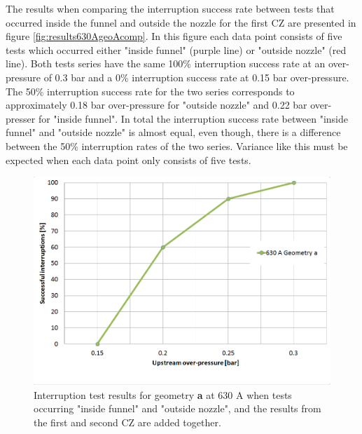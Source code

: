 \documentclass[10pt,b5paper,twoside]{article}
\begin{document}
The results when comparing the interruption success rate between tests that occurred inside the funnel and outside the nozzle for the first CZ are presented in figure \ref{fig:results630AgeoAcomp}. In this figure each data point consists of five tests which occurred either "inside funnel" (purple line) or "outside nozzle" (red line). Both tests series have the same 100\% interruption success rate at an over-pressure of 0.3 bar and a 0\% interruption success rate at 0.15 bar over-pressure. The 50\% interruption success rate for the two series corresponds to approximately 0.18 bar over-pressure for "outside nozzle" and 0.22 bar over-presser for "inside funnel". In total the interruption success rate between "inside funnel" and "outside nozzle" is almost equal, even though, there is a difference between the 50\% interruption rates of the two series. Variance like this must be expected when each data point only consists of five tests.

\begin{figure}[H]
\centering
\includegraphics[scale=0.45]{Bilder/Results/geoA630amp_riktig.PNG}
\caption{Interruption test results for geometry \textbf{a} at 630 A when tests occurring "inside funnel" and "outside nozzle", and the results from the first and second CZ are added together.} \label{fig:results630AgeoA}
\end{figure}
\end{document}
